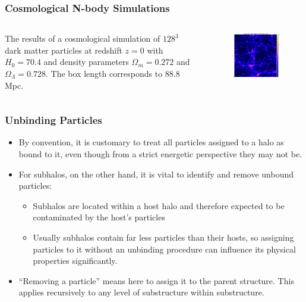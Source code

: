 \begin{frame}
	\frametitle{Cosmological N-body Simulations}

	\begin{columns}
			The results of a cosmological simulation of $128^3$ dark
			matter particles at redshift $z = 0$ with $H_0 = 70.4$ and density parameters $\Omega_m = 0.272$ and $\Omega_\Lambda= 0.728$.
			The box length corresponds to 88.8 Mpc.
			\vfill
			\begin{figure}
				\centering
				\includegraphics[width=8.2cm]{../report/images/cosmo/cos-part2map-npart.png}
			\end{figure}
		\vfill
	\end{columns}

\end{frame}










\begin{frame}
	\frametitle{Unbinding Particles}


	\begin{itemize}
		\item By convention, it is customary to treat all particles assigned to a halo as bound to it, even though from a strict energetic perspective they may not be.
		\item For subhalos, on the other hand, it is vital to identify and remove unbound particles:
		\begin{itemize}
			\item Subhalos are located within a host halo and therefore expected to be contaminated by the host's particles
			\item Usually subhalos contain far less particles than their hosts, so assigning particles to it without an unbinding procedure can influence its physical properties significantly.
		\end{itemize}
		\item ``Removing a particle'' means here to assign it to the parent structure. This applies recursively to any level of substructure within substructure.
	\end{itemize}


\end{frame}







